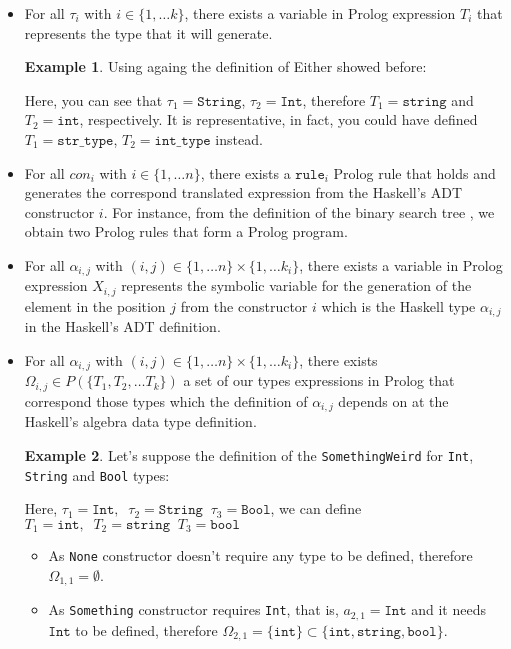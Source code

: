 \documentclass{report}
\theoremstyle{definition}
\newtheorem{example}{Example}[section]
\theoremstyle{definition}
\newcommand{\ttt}[1]{\texttt{#1}}
\newcommand{\tav}{\;\;}
\begin{document}
\begin{itemize}
	\item For all $\tau_i$ with $i \in \{1, \ldots k \}$, there exists a variable in Prolog expression $T_i$ that represents the type that it will generate.
	\begin{example}
		Using againg the definition of Either showed before:
		
		Here, you can see that $\tau_1 = \ttt{String}$, $\tau_2 = \ttt{Int}$, therefore $T_1 = \ttt{string}$ and $T_2 = \ttt{int}$, respectively. It is representative, in fact, you could have defined $T_1 = \ttt{str\_type}$, $T_2 = \ttt{int\_type}$ instead.
	\end{example}
	\item For all $con_i$ with $i \in \{1, \ldots n \}$, there exists a $\ttt{rule}_i$ Prolog rule that holds and generates the correspond translated expression from the Haskell's ADT constructor $i$. For instance, from the definition of the binary search tree , we obtain two Prolog rules that form a Prolog program.
	\item For all $\alpha_{i,j}$ with $(i,j) \in \{1, \ldots n \} \times \{1, \ldots k_i \}$, there exists a variable in Prolog expression $X_{i,j}$ represents the symbolic variable for the generation of the element in the position $j$ from the constructor $i$ which is the Haskell type $\alpha_{i,j}$ in the Haskell's ADT definition.
	\item For all $\alpha_{i,j}$ with $(i,j) \in \{1, \ldots n \} \times \{1, \ldots k_i \}$, there exists $\Omega_{i,j} \in P(\{ T_1 , T_2, \ldots T_k \}) $ a set of our types expressions in Prolog that correspond those types which the definition of $\alpha_{i,j}$ depends on at the Haskell's algebra data type definition.
	\begin{example}
		Let's suppose the definition of the \ttt{SomethingWeird} for \ttt{Int}, \ttt{String} and \ttt{Bool} types:
		
		Here, $\tau_1 = \ttt{Int}, \tav \tau_2=\ttt{String} \tav \tau_3=\ttt{Bool}$, we can define $T_1 = \ttt{int}, \tav T_2=\ttt{string} \tav T_3=\ttt{bool}$
		\begin{itemize}
			\item As \ttt{None} constructor doesn't require any type to be defined, therefore $\Omega_{1,1} = \emptyset$.
			\item As \ttt{Something} constructor requires \ttt{Int}, that is, $a_{2,1} = \ttt{Int}$ and it needs $\ttt{Int}$ to be defined, therefore $\Omega_{2,1} = \{\ttt{int}\} \subset \{ \ttt{int}, \ttt{string}, \ttt{bool} \}$.

\end{itemize}
\end{example}
\end{itemize}
\end{document}
